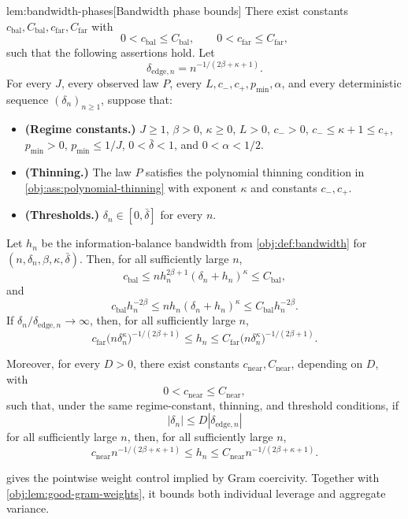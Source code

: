 \begin{lemmav}{lem:bandwidth-phases}[Bandwidth phase bounds]
There exist constants \(c_{\mathrm{bal}},C_{\mathrm{bal}},c_{\mathrm{far}},C_{\mathrm{far}}\) with
\[
0<c_{\mathrm{bal}}\le C_{\mathrm{bal}},
\qquad
0<c_{\mathrm{far}}\le C_{\mathrm{far}},
\]
such that the following assertions hold.  Let
\[
\delta_{\mathrm{edge},n}
=
n^{-1/(2\beta+\kappa+1)} .
\]
For every \(J\), every observed law \(P\), every \(L,c_-,c_+,p_{\min},\alpha\), and every deterministic sequence \((\delta_n)_{n\ge1}\), suppose that:
\begin{itemize}
\item \textbf{(Regime constants.)} \(J\ge1\), \(\beta>0\), \(\kappa\ge0\), \(L>0\), \(c_->0\), \(c_-\le \kappa+1\le c_+\), \(p_{\min}>0\), \(p_{\min}\le 1/J\), \(0<\bar\delta<1\), and \(0<\alpha<1/2\).
\item \textbf{(Thinning.)} The law \(P\) satisfies the polynomial thinning condition in \cref{obj:ass:polynomial-thinning} with exponent \(\kappa\) and constants \(c_-,c_+\).
\item \textbf{(Thresholds.)} \(\delta_n\in[0,\bar\delta]\) for every \(n\).
\end{itemize}
Let \(h_n\) be the information-balance bandwidth from \cref{obj:def:bandwidth} for \((n,\delta_n,\beta,\kappa,\bar\delta)\).  Then, for all sufficiently large \(n\),
\[
c_{\mathrm{bal}}
\le
n h_n^{2\beta+1}(\delta_n+h_n)^\kappa
\le
C_{\mathrm{bal}},
\]
and
\[
c_{\mathrm{bal}}h_n^{-2\beta}
\le
n h_n(\delta_n+h_n)^\kappa
\le
C_{\mathrm{bal}}h_n^{-2\beta}.
\]
If \(\delta_n/\delta_{\mathrm{edge},n}\to\infty\), then, for all sufficiently large \(n\),
\[
c_{\mathrm{far}}\bigl(n\delta_n^\kappa\bigr)^{-1/(2\beta+1)}
\le
h_n
\le
C_{\mathrm{far}}\bigl(n\delta_n^\kappa\bigr)^{-1/(2\beta+1)} .
\]

Moreover, for every \(D>0\), there exist constants \(c_{\mathrm{near}},C_{\mathrm{near}}\), depending on \(D\), with
\[
0<c_{\mathrm{near}}\le C_{\mathrm{near}},
\]
such that, under the same regime-constant, thinning, and threshold conditions, if
\[
|\delta_n|\le D|\delta_{\mathrm{edge},n}|
\]
for all sufficiently large \(n\), then, for all sufficiently large \(n\),
\[
c_{\mathrm{near}}n^{-1/(2\beta+\kappa+1)}
\le
h_n
\le
C_{\mathrm{near}}n^{-1/(2\beta+\kappa+1)} .
\]
\end{lemmav}

 gives the pointwise weight control implied by Gram coercivity. Together with \cref{obj:lem:good-gram-weights}, it bounds both individual leverage and aggregate variance.

